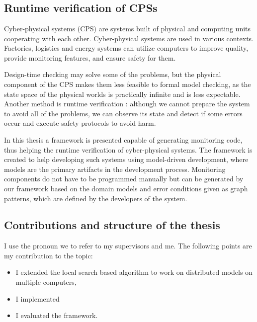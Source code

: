 \chapter{\bevezetes}

\section{Runtime verification of CPSs}
Cyber-physical systems (CPS) are systems built of physical and computing units cooperating with each other.
Cyber-physical systems are used in various contexts. 
Factories, logistics and energy systems can utilize computers to improve quality, provide monitoring features, and ensure safety for them.

Design-time checking may solve some of the problems, but the physical component of the CPS makes them less feasible to formal model checking, as the state space of the physical worlds is practically infinite and is less expectable.
Another method is runtime verification \cite{fasecikk}: although we cannot prepare the system to avoid all of the problems, we can observe its state and detect if some errors occur and execute safety protocols to avoid harm. 


In this thesis a framework is presented capable of generating monitoring code, thus helping the runtime verification of cyber-physical systems. 
The framework is created to help developing such systems using model-driven development, where models are the primary artifacts in the development process.
Monitoring components do not have to be programmed manually but can be generated by our framework based on the domain models and error conditions given as graph patterns, which are defined by the developers of the system.

\section{Contributions and structure of the thesis}

I use the pronoun we to refer to my supervisors and me. 
The following points are my contribution to the topic:
\begin{itemize}
	\item I extended the local search based algorithm to work on distributed models on multiple computers,
	\item I implemented 
	\item I evaluated the framework.
\end{itemize}
	
